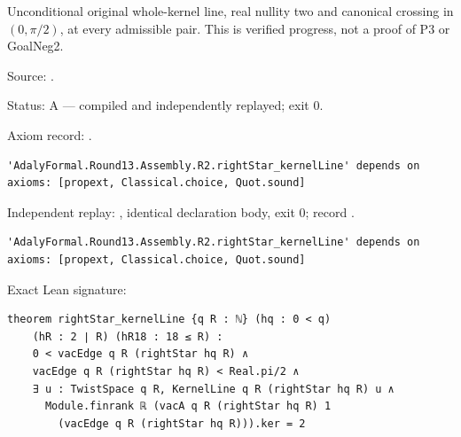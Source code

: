 \begin{theorem}[bp-576]
\label{bp-576}
\leanok
Unconditional original whole-kernel line, real nullity two and canonical crossing in \((0,\pi/2)\), at every admissible pair. This is verified progress, not a proof of P3 or GoalNeg2.

\par Source: \texttt{}.
\par Status: A — compiled and independently replayed; exit 0.
\par Axiom record: \texttt{}.
\begin{verbatim}
'AdalyFormal.Round13.Assembly.R2.rightStar_kernelLine' depends on axioms: [propext, Classical.choice, Quot.sound]
\end{verbatim}
\par Independent replay: \texttt{}, identical declaration body, exit 0; record \texttt{}.
\begin{verbatim}
'AdalyFormal.Round13.Assembly.R2.rightStar_kernelLine' depends on axioms: [propext, Classical.choice, Quot.sound]
\end{verbatim}
\par Exact Lean signature:
\begin{verbatim}
theorem rightStar_kernelLine {q R : ℕ} (hq : 0 < q)
    (hR : 2 ∣ R) (hR18 : 18 ≤ R) :
    0 < vacEdge q R (rightStar hq R) ∧
    vacEdge q R (rightStar hq R) < Real.pi/2 ∧
    ∃ u : TwistSpace q R, KernelLine q R (rightStar hq R) u ∧
      Module.finrank ℝ (vacA q R (rightStar hq R) 1
        (vacEdge q R (rightStar hq R))).ker = 2
\end{verbatim}
\end{theorem}

